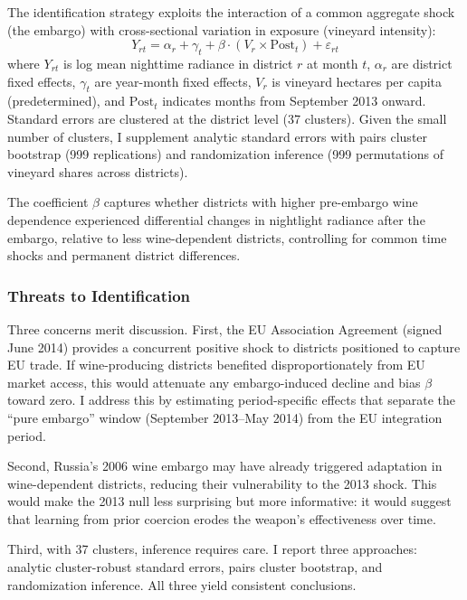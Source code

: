 \documentclass[12pt]{article}
\begin{document}
The identification strategy exploits the interaction of a common aggregate shock (the embargo) with cross-sectional variation in exposure (vineyard intensity):
\begin{equation}
Y_{rt} = \alpha_r + \gamma_t + \beta \cdot (V_r \times \text{Post}_t) + \varepsilon_{rt}
\label{eq:main}
\end{equation}
where $Y_{rt}$ is log mean nighttime radiance in district $r$ at month $t$, $\alpha_r$ are district fixed effects, $\gamma_t$ are year-month fixed effects, $V_r$ is vineyard hectares per capita (predetermined), and $\text{Post}_t$ indicates months from September 2013 onward. Standard errors are clustered at the district level (37 clusters). Given the small number of clusters, I supplement analytic standard errors with pairs cluster bootstrap (999 replications) and randomization inference (999 permutations of vineyard shares across districts).

The coefficient $\beta$ captures whether districts with higher pre-embargo wine dependence experienced differential changes in nightlight radiance after the embargo, relative to less wine-dependent districts, controlling for common time shocks and permanent district differences.

\subsubsection*{Threats to Identification} Three concerns merit discussion. First, the EU Association Agreement (signed June 2014) provides a concurrent positive shock to districts positioned to capture EU trade. If wine-producing districts benefited disproportionately from EU market access, this would attenuate any embargo-induced decline and bias $\beta$ toward zero. I address this by estimating period-specific effects that separate the ``pure embargo'' window (September 2013--May 2014) from the EU integration period.

Second, Russia's 2006 wine embargo may have already triggered adaptation in wine-dependent districts, reducing their vulnerability to the 2013 shock. This would make the 2013 null less surprising but more informative: it would suggest that learning from prior coercion erodes the weapon's effectiveness over time.

Third, with 37 clusters, inference requires care. I report three approaches: analytic cluster-robust standard errors, pairs cluster bootstrap, and randomization inference. All three yield consistent conclusions.
\end{document}
